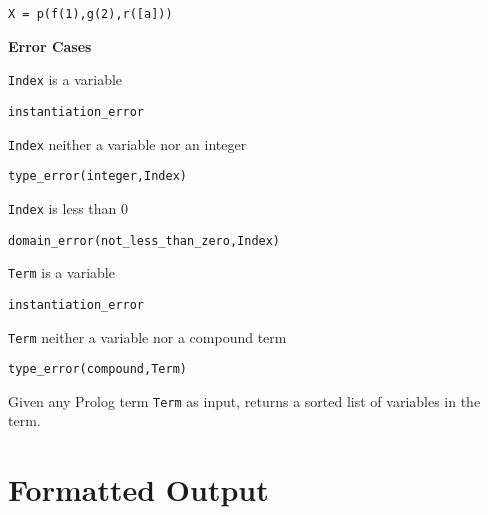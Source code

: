 \begin{description}
{\begin{verbatim}
X = p(f(1),g(2),r([a]))
\end{verbatim}
}

{\bf Error Cases} 
\bi
\item 	{\tt Index} is a variable
\bi
\item    {\tt instantiation\_error}
\ei
\item 	{\tt Index} neither a variable nor an integer
\bi
\item    {\tt type\_error(integer,Index)}
\ei
\item 	{\tt Index} is less than 0
\bi
\item    {\tt domain\_error(not\_less\_than\_zero,Index)}
\ei
\item 	{\tt Term} is a variable
\bi
\item    {\tt instantiation\_error}
\ei
\item 	{\tt Term} neither a variable nor a compound term
\bi
\item    {\tt type\_error(compound,Term)}
\ei
\ei


% 
Given any Prolog term {\tt Term} as input, returns a sorted list of
variables in the term.  
\end{description}

\section{Formatted Output}

